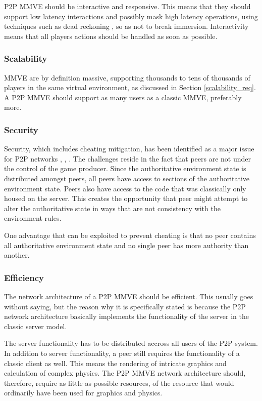 P2P MMVE should be interactive and responsive. This means that they should support low latency interactions and possibly mask high latency operations, using techniques such as dead reckoning \cite{cheat_proof_playout}, so as not to break immersion. Interactivity means that all players actions should be handled as soon as possible.

\subsubsection{Scalability}

MMVE are by definition massive, supporting thousands to tens of thousands of players in the same virtual environment, as discussed in Section \ref{scalability_req}. A P2P MMVE should support as many users as a classic MMVE, preferably more.

\subsubsection{Security}

Security, which includes cheating mitigation, has been identified as a major issue for P2P networks \cite{knutsson_p2p_first}, \cite{challenges_p2p_gaming}, \cite{cheat_proof_event_ordering}. The challenges reside in the fact that peers are not under the control of the game producer. Since the authoritative environment state is distributed amongst peers, all peers have access to sections of the authoritative environment state. Peers also have access to the code that was classically only housed on the server. This creates the opportunity that peer might attempt to alter the authoritative state in ways that are not consistency with the environment rules.

One advantage that can be exploited to prevent cheating is that no peer contains all authoritative environment state and no single peer has more authority than another.

\subsubsection{Efficiency}

The network architecture of a P2P MMVE should be efficient. This usually goes without saying, but the reason why it is specifically stated is because the P2P network architecture basically implements the functionality of the server in the classic server model.

The server functionality has to be distributed accross all users of the P2P system. In addition to server functionality, a peer still requires the functionality of a classic client as well. This means the rendering of intricate graphics and calculation of complex physics. The P2P MMVE network architecture should, therefore, require as little as possible resources, of the resource that would ordinarily have been used for graphics and physics.

